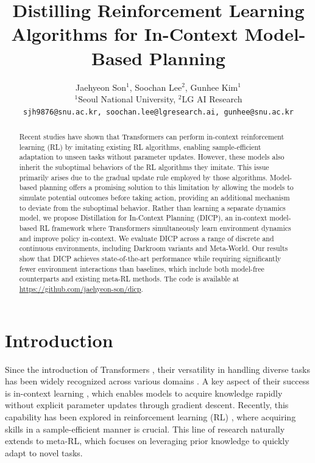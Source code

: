 \documentclass{article}
\title{Distilling Reinforcement Learning Algorithms for In-Context Model-Based Planning}
\author{Jaehyeon Son$^1$, Soochan Lee$^2$, Gunhee Kim$^1$
\\
$^1$Seoul National University, $^2$LG AI Research\\
\texttt{sjh9876@snu.ac.kr, soochan.lee@lgresearch.ai, gunhee@snu.ac.kr}\\
}
\begin{document}
\maketitle

\begin{abstract}
    Recent studies have shown that Transformers can perform in-context reinforcement learning (RL) by imitating existing RL algorithms, enabling sample-efficient adaptation to unseen tasks without parameter updates.
    However, these models also inherit the suboptimal behaviors of the RL algorithms they imitate.
    This issue primarily arises due to the gradual update rule employed by those algorithms.
    Model-based planning offers a promising solution to this limitation by allowing the models to simulate potential outcomes before taking action, providing an additional mechanism to deviate from the suboptimal behavior.
    Rather than learning a separate dynamics model, we propose Distillation for In-Context Planning (DICP), an in-context model-based RL framework where Transformers simultaneously learn environment dynamics and improve policy in-context.
    We evaluate DICP across a range of discrete and continuous environments, including Darkroom variants and Meta-World.
    Our results show that DICP achieves state-of-the-art performance while requiring significantly fewer environment interactions than baselines, which include both model-free counterparts and existing meta-RL methods.
    The code is available at \href{https://github.com/jaehyeon-son/dicp}{https://github.com/jaehyeon-son/dicp}.
\end{abstract}


\section{Introduction}
\label{sec:intro}

Since the introduction of Transformers \citep{TF}, their versatility in handling diverse tasks has been widely recognized across various domains \citep{GPT3, ViT, GPT4}.
A key aspect of their success is in-context learning \citep{GPT3}, which enables models to acquire knowledge rapidly without explicit parameter updates through gradient descent.
Recently, this capability has been explored in reinforcement learning (RL) \citep{DT, PPO, MGDT, GATO}, where acquiring skills in a sample-efficient manner is crucial.
This line of research naturally extends to meta-RL, which focuses on leveraging prior knowledge to quickly adapt to novel tasks.
\end{document}
